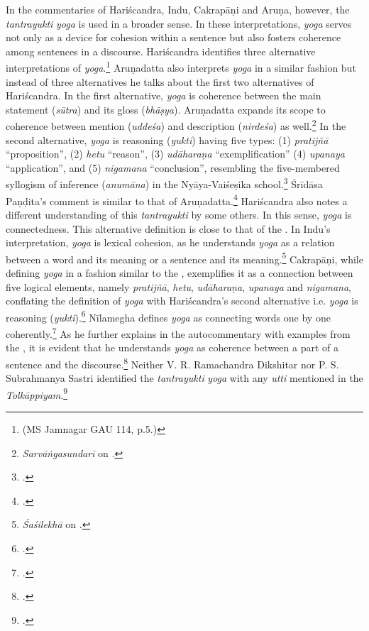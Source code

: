 In the commentaries of Hariścandra, Indu, Cakrapāṇi and Aruṇa, however, the 
\emph{tantrayukti} \emph{yoga} is used in a broader sense. In these 
interpretations, \emph{yoga} serves not only as a device for cohesion within a 
sentence but also fosters coherence among sentences in a discourse. Hariścandra 
identifies three alternative interpretations of \emph{yoga}.\footnote{ (MS 
Jamnagar 
GAU 114, p.5.)} 
Aruṇadatta also interprets \emph{yoga} in a similar fashion but instead of three 
alternatives he talks about the first two alternatives of Hariścandra. In the first 
alternative, \emph{yoga} is coherence between the main statement 
(\emph{sūtra}) and its gloss (\emph{bhāṣya}).
Aruṇadatta expands its scope to coherence between mention (\emph{uddeśa}) 
and description (\emph{nirdeśa}) as well.\footnote{ \emph{Sarvāṅgasundarī} on 
.}  
In the second alternative, \emph{yoga} is reasoning (\emph{yukti}) having five 
types: (1) \emph{pratijñā} “proposition”, (2) \emph{hetu} “reason”, (3) 
\emph{udāharaṇa} “exemplification” (4) \emph{upanaya} “application”, and (5) 
\emph{nigamana} “conclusion”, resembling the five-membered syllogism of 
inference (\emph{anumāna}) in the Nyāya-Vaiśeṣika school.\footnote{
	 .}
Śrīdāsa Paṇḍita's comment is similar to that of 
Aruṇadatta.\footcite[2]{muss-1940}  
Hariścandra also notes a different understanding of this \emph{tantrayukti} by 
some others. In this sense, \emph{yoga} is connectedness. This alternative 
definition is close to that of the \SS. In Indu's interpretation, \emph{yoga} is 
lexical 
cohesion, as he understands \emph{yoga} as a relation between a word and its 
meaning or a sentence and its meaning.\footnote{ \emph{Śaśilekhā} on 
.} 
Cakrapāṇi, while defining \emph{yoga} in a fashion similar to the \SS, 
exemplifies it as a connection between five logical elements, namely 
\emph{pratijñā}, \emph{hetu}, \emph{udāharaṇa}, \emph{upanaya} and 
\emph{nigamana}, conflating the definition of \emph{yoga} with Hariścandra's 
second alternative i.e. \emph{yoga} is reasoning 
(\emph{yukti}).\footnote{ .} 
Nīlamegha defines \emph{yoga} as connecting words one by one 
coherently.\footnote{ 
\cite[2][3]{muth-1976}.} As he further explains in the autocommentary with 
examples from the \AHS, it is evident that he understands \emph{yoga} as 
coherence between a part of a sentence and the 
discourse.\footcite[3]{muth-1976} 
Neither V. R. Ramachandra Dikshitar nor P. S. Subrahmanya Sastri identified the 
\emph{tantrayukti} \emph{yoga} with any \emph{utti} mentioned in the 
\emph{Tolkāppiyam}.\footnote{\cite[84]{chev-2009}.} 

